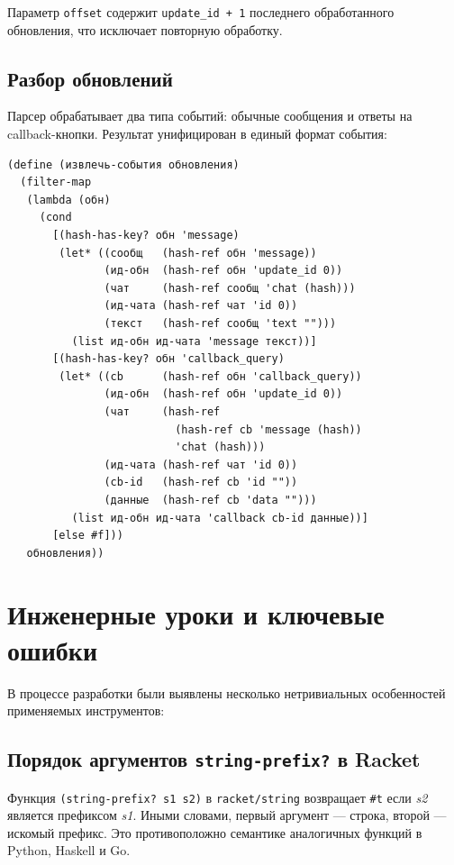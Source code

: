 \documentclass[11pt,a4paper]{article}
\begin{document}
Параметр \texttt{offset} содержит \texttt{update\_id + 1} последнего обработанного
обновления, что исключает повторную обработку.

\subsection{Разбор обновлений}

Парсер обрабатывает два типа событий: обычные сообщения и ответы на callback-кнопки.
Результат унифицирован в единый формат события:

\begin{lstlisting}[language=Racket, caption={Парсер обновлений: унификация событий}]
(define (извлечь-события обновления)
  (filter-map
   (lambda (обн)
     (cond
       [(hash-has-key? обн 'message)
        (let* ((сообщ   (hash-ref обн 'message))
               (ид-обн  (hash-ref обн 'update_id 0))
               (чат     (hash-ref сообщ 'chat (hash)))
               (ид-чата (hash-ref чат 'id 0))
               (текст   (hash-ref сообщ 'text "")))
          (list ид-обн ид-чата 'message текст))]
       [(hash-has-key? обн 'callback_query)
        (let* ((cb      (hash-ref обн 'callback_query))
               (ид-обн  (hash-ref обн 'update_id 0))
               (чат     (hash-ref
                          (hash-ref cb 'message (hash))
                          'chat (hash)))
               (ид-чата (hash-ref чат 'id 0))
               (cb-id   (hash-ref cb 'id ""))
               (данные  (hash-ref cb 'data "")))
          (list ид-обн ид-чата 'callback cb-id данные))]
       [else #f]))
   обновления))
\end{lstlisting}

\section{Инженерные уроки и ключевые ошибки}

В процессе разработки были выявлены несколько нетривиальных особенностей
применяемых инструментов:

\subsection{Порядок аргументов \texttt{string-prefix?} в Racket}

\begin{conceptbox}
Функция \texttt{(string-prefix? s1 s2)} в \texttt{racket/string}
возвращает \texttt{\#t} если \emph{s2} является префиксом \emph{s1}.
Иными словами, первый аргумент — строка, второй — искомый префикс.
Это противоположно семантике аналогичных функций в Python, Haskell и Go.
\end{conceptbox}
\end{document}
